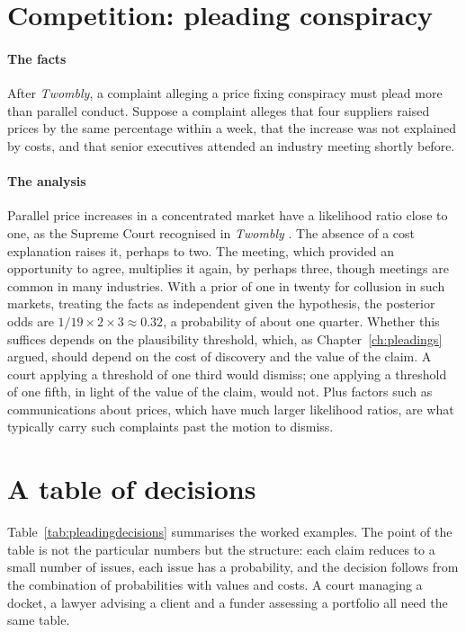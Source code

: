 \section{Competition: pleading conspiracy}

\paragraph{The facts} After \emph{Twombly}, a complaint alleging a price fixing conspiracy must plead more than parallel conduct. Suppose a complaint alleges that four suppliers raised prices by the same percentage within a week, that the increase was not explained by costs, and that senior executives attended an industry meeting shortly before.

\paragraph{The analysis} Parallel price increases in a concentrated market have a likelihood ratio close to one, as the Supreme Court recognised in \emph{Twombly} \citep{twombly2007}. The absence of a cost explanation raises it, perhaps to two. The meeting, which provided an opportunity to agree, multiplies it again, by perhaps three, though meetings are common in many industries. With a prior of one in twenty for collusion in such markets, treating the facts as independent given the hypothesis, the posterior odds are $1/19\times 2\times 3\approx 0.32$, a probability of about one quarter. Whether this suffices depends on the plausibility threshold, which, as Chapter~\ref{ch:pleadings} argued, should depend on the cost of discovery and the value of the claim. A court applying a threshold of one third would dismiss; one applying a threshold of one fifth, in light of the value of the claim, would not. Plus factors such as communications about prices, which have much larger likelihood ratios, are what typically carry such complaints past the motion to dismiss.

\section{A table of decisions}

Table~\ref{tab:pleadingdecisions} summarises the worked examples. The point of the table is not the particular numbers but the structure: each claim reduces to a small number of issues, each issue has a probability, and the decision follows from the combination of probabilities with values and costs. A court managing a docket, a lawyer advising a client and a funder assessing a portfolio all need the same table.

